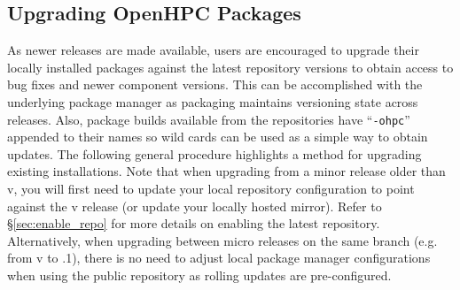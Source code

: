 \subsection{Upgrading OpenHPC Packages}  \label{appendix:upgrade}


As newer \OHPC{} releases are made available, users are encouraged to upgrade
their locally installed packages against the latest repository versions to
obtain access to bug fixes and newer component versions. This can be
accomplished with the underlying package manager as \OHPC{} packaging maintains
versioning state across releases. Also, package builds available from the
\OHPC{} repositories have ``\texttt{-ohpc}'' appended to their names so
wild cards can be used as a simple way to obtain updates. The following general
procedure highlights a method for upgrading existing installations.  Note that
when upgrading from a minor release older than v\OHPCVerTree{}, you will first
need to update your local \OHPC{} repository configuration to point against the
v\OHPCVerTree{} release (or update your locally hosted mirror). Refer to
\S\ref{sec:enable_repo} for more details on enabling the latest
repository. Alternatively, when upgrading between micro releases on the same
branch (e.g. from v\OHPCVerTree{} to \OHPCVerTree{}.1), there is no need to
adjust local package manager configurations when using the public repository as
rolling updates are pre-configured.
 
